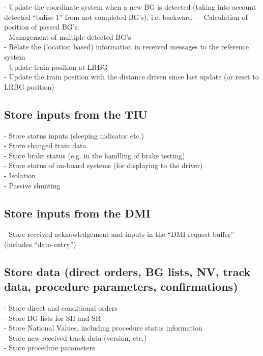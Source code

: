 \documentclass{template/openetcs_report}
\begin{document}
- Update the coordinate system when a new \gls{BG} is detected (taking into account detected “balise 1” from not completed \gls{BG}'s), i.e. backward -   - Calculation of position of passed \gls{BG}'s.\\
- Management of multiple detected \gls{BG}'s\\
- Relate the (location based) information in received messages to the reference system\\
- Update train position at LR\gls{BG}\\
- Update the train position with the distance driven since last update (or reset to LR\gls{BG} position)\\



\subsection{Store inputs from the TIU}
- Store status inputs (sleeping indicator etc.)\\
- Store changed train data\\
- Store brake status (e.g. in the handling of brake testing).\\
- Store status of on-board systems (for displaying to the driver)\\
- Isolation\\
- Passive shunting\\

\subsection{Store inputs from the \gls{DMI}}
- Store received acknowledgement and inputs in the “\gls{DMI} request buffer” (includes “data-entry”)\\

\subsection{Store data (direct orders, \gls{BG} lists, NV, track data, procedure parameters, confirmations)}
- Store direct and conditional orders\\
- Store \gls{BG} lists for SH and SR\\
- Store National Values, including procedure status information\\
- Store new received track data (version, etc.)\\
- Store procedure parameters\\
\end{document}
